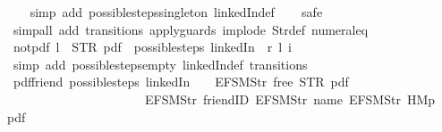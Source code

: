\begin{isabellebody}
%
\isadelimproof
\ \ %
\endisadelimproof
%
\isatagproof
{}\isamarkupfalse%
\ {\isacharparenleft}simp\ add{\isacharcolon}\ possible{\isacharunderscore}steps{\isacharunderscore}singleton\ linkedIn{\isacharunderscore}def{\isacharparenright}\isanewline
\ \ \isamarkupfalse%
\ safe\isanewline
\ \ \isamarkupfalse%
\ {\isacharparenleft}simp{\isacharunderscore}all\ add{\isacharcolon}\ transitions\ apply{\isacharunderscore}guards\ implode\ Str{\isacharunderscore}def\ numeral{\isacharunderscore}{}{\isacharunderscore}eq{\isacharunderscore}{}{\isacharparenright}%
\endisatagproof
{\isafoldproof}%
%
\isadelimproof
\isanewline
%
\endisadelimproof
\isanewline
{}\isamarkupfalse%
\ not{\isacharunderscore}pdf{\isacharunderscore}{}{\isacharcolon}\ {\isachardoublequoteopen}l\ {\isasymnoteq}\ STR\ {\isacharprime}{\isacharprime}pdf{\isacharprime}{\isacharprime}\ {\isasymLongrightarrow}\ possible{\isacharunderscore}steps\ linkedIn\ {}\ r\ l\ i\ {\isacharequal}\ {\isacharbraceleft}{\isacharbar}{\isacharbar}{\isacharbraceright}{\isachardoublequoteclose}\isanewline
%
\isadelimproof
\ \ %
\endisadelimproof
%
\isatagproof
{}\isamarkupfalse%
\ {\isacharparenleft}simp\ add{\isacharcolon}\ possible{\isacharunderscore}steps{\isacharunderscore}empty\ linkedIn{\isacharunderscore}def\ transitions{\isacharparenright}%
\endisatagproof
{\isafoldproof}%
%
\isadelimproof
\isanewline
%
\endisadelimproof
\isanewline
{}\isamarkupfalse%
\ pdf{\isacharunderscore}friend{\isacharcolon}\ {\isachardoublequoteopen}possible{\isacharunderscore}steps\ linkedIn\ {}\ {\isacharparenleft}{\isacharless}{\isachargreater}{\isacharparenleft}{}\ {\isacharcolon}{\isacharequal}\ EFSM{\isachardot}Str\ {\isacharprime}{\isacharprime}free{\isacharprime}{\isacharprime}{\isacharparenright}{\isacharparenright}\ STR\ {\isacharprime}{\isacharprime}pdf{\isacharprime}{\isacharprime}\isanewline
\ \ \ \ \ \ \ \ \ \ \ \ \ \ \ \ \ \ \ \ \ \ {\isacharbrackleft}EFSM{\isachardot}Str\ {\isacharprime}{\isacharprime}friendID{\isacharprime}{\isacharprime}{\isacharcomma}\ EFSM{\isachardot}Str\ {\isacharprime}{\isacharprime}name{\isacharprime}{\isacharprime}{\isacharcomma}\ EFSM{\isachardot}Str\ {\isacharprime}{\isacharprime}HM{}p{\isacharprime}{\isacharprime}{\isacharbrackright}\ {\isacharequal}\ {\isacharbraceleft}{\isacharbar}{\isacharparenleft}{}{\isacharcomma}\ pdf{\isacharparenright}{\isacharbar}{\isacharbraceright}{\isachardoublequoteclose}\isanewline

\end{isabellebody}
